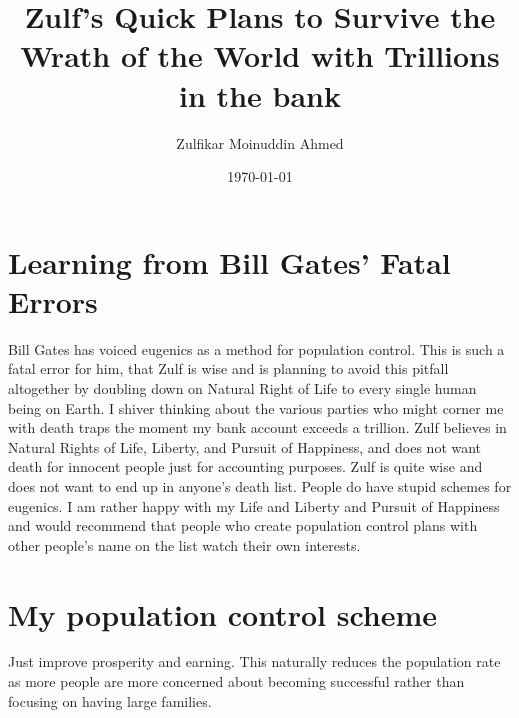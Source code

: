 \documentclass{amsart}
\title{Zulf's Quick Plans to Survive the Wrath of the World with Trillions in the bank}
\author{Zulfikar Moinuddin Ahmed}
\date{\today}
\begin{document}
\maketitle

\section{Learning from Bill Gates' Fatal Errors}

Bill Gates has voiced eugenics as a method for population control.  This is such a fatal error for him, that Zulf is wise and is planning to avoid this pitfall altogether by doubling down on Natural Right of Life to every single human being on Earth.  I shiver thinking about the various parties who might corner me with death traps the moment my bank account exceeds a trillion. Zulf believes in Natural Rights of Life, Liberty, and Pursuit of Happiness, and does not want death for innocent people just for accounting purposes.  Zulf is quite wise and does not want to end up in anyone's death list.  People do have stupid schemes for eugenics.  I am rather happy with my Life and Liberty and Pursuit of Happiness and would recommend that people who create population control plans with other people's name on the list watch their own interests.  

\section{My population control scheme}

Just improve prosperity and earning.  This naturally reduces the population rate as more people are more concerned about becoming successful rather than focusing on having large families.
\end{document}
